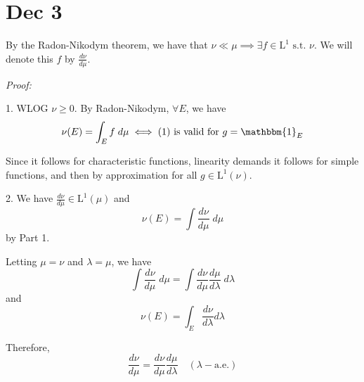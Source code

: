 \documentclass[12pt]{report}
\newcommand{\ind}{\mathbbm{1}}
\renewcommand{\L}{\text{L}}
\newcommand{\st}{\text{ s.t. }}
\newenvironment*{tbox}[2][gray]{
    \begin{tcolorbox}[
        parbox=false,
        colback=#1!5!white,
        colframe=#1!75!black,
        breakable,
        title={#2}
    ]}
    {\end{tcolorbox}}
\begin{document}
\section*{Dec 3} 
    By the Radon-Nikodym theorem, we have that $\nu \ll \mu \implies \exists f \in \L^1 \st \nu$. We will denote this $f$ by $\frac{d\nu}{d\mu}$. 

    \begin{tbox}{\textbf{Proposition (Chain Rule):} Suppose $\nu$ is a $\sigma$-finite signed measure and $\mu, \lambda$ are $\sigma$-finite positive measures. Assume $\nu \ll \mu$ and $\mu \ll \lambda$. Then 
        \begin{enumerate}
            \item If $g \in \L^1(\nu)$, then $g \frac{d\nu}{d\mu} \in \L^1(\mu)$ and 
            \[\int g \; d\nu = \int g \frac{d\nu}{d\mu} \; d\mu\]
            \item $\nu \ll \lambda$ and 
            \[\frac{d\nu}{d\lambda} = \frac{d\nu}{d\mu}\cdot \frac{d\mu}{d\lambda} \quad (\lambda-\text{a.e.})\]
        \end{enumerate}}
        \emph{Proof:} 

        1. WLOG $\nu \geq 0$. By Radon-Nikodym, $\forall E$, we have 
        \[\nu(E) = \int_E f \; d\mu \iff \text{(1) is valid for } g = \ind_E \]

        Since it follows for characteristic functions, linearity demands it follows for simple functions, and then by approximation for all $g \in \L^1(\nu)$.

        2. We have $\frac{d\nu}{d\mu} \in \L^1(\mu)$ and 
        \[\nu(E) = \int \frac{d\nu}{d\mu}\; d\mu\]
        by Part 1. 

        Letting $\mu = \nu$ and $\lambda = \mu$, we have 
        \[\int \frac{d\nu}{d\mu}\; d\mu = \int \frac{d\nu}{d\mu} \frac{d\mu}{d\lambda} \; d\lambda\]
        and 
        \[\nu(E) = \int_E \frac{d\nu}{d\lambda} d\lambda\]

        Therefore, 
        \[\frac{d\nu}{d\mu} = \frac{d\nu}{d\mu} \frac{d\mu}{d\lambda} \quad (\lambda-\text{a.e.})\]
    \end{tbox}
\end{document}
